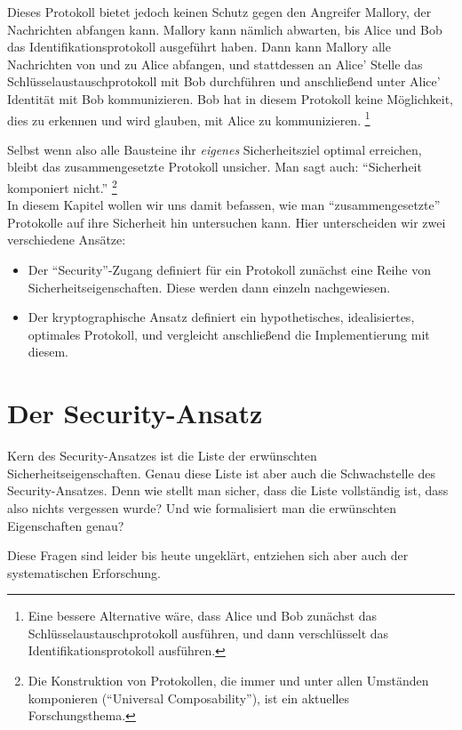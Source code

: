 \begin{beispiel}
	Dieses Protokoll bietet jedoch keinen Schutz gegen den Angreifer Mallory, der Nachrichten abfangen kann. Mallory kann nämlich abwarten, bis Alice und Bob das Identifikationsprotokoll ausgeführt haben. Dann kann Mallory alle Nachrichten von und zu Alice abfangen, und stattdessen an Alice' Stelle das Schlüsselaustauschprotokoll mit Bob durchführen und anschließend unter Alice' Identität mit Bob kommunizieren. Bob hat in diesem Protokoll keine Möglichkeit, dies zu erkennen und wird glauben, mit Alice zu kommunizieren.%
	\footnote{Eine bessere Alternative wäre, dass Alice und Bob zunächst das Schlüsselaustauschprotokoll ausführen, und dann verschlüsselt das Identifikationsprotokoll ausführen.}\\
\end{beispiel}

Selbst wenn also alle Bausteine ihr \emph{eigenes} Sicherheitsziel optimal erreichen, bleibt das zusammengesetzte Protokoll unsicher. Man sagt auch: "`Sicherheit komponiert nicht."'%
\footnote{Die Konstruktion von Protokollen, die immer und unter allen Umständen komponieren ("`Universal Composability"'), ist ein aktuelles Forschungsthema.}
\\

In diesem Kapitel wollen wir uns damit befassen, wie man "`zusammengesetzte"' Protokolle auf ihre Sicherheit hin untersuchen kann. Hier unterscheiden wir zwei verschiedene Ansätze:
\begin{itemize}
	\item Der "`Security"'-Zugang definiert für ein Protokoll zunächst eine Reihe von Sicherheitseigenschaften. Diese werden dann einzeln nachgewiesen.
	\item Der kryptographische Ansatz definiert ein hypothetisches, idealisiertes, optimales Protokoll, und vergleicht anschließend die Implementierung mit diesem.
\end{itemize}

\section{Der Security-Ansatz}

Kern des Security-Ansatzes ist die Liste der erwünschten Sicherheitseigenschaften. Genau diese Liste ist aber auch die Schwachstelle des Security-Ansatzes.
Denn wie stellt man sicher, dass die Liste vollständig ist, dass also nichts vergessen wurde?
Und wie formalisiert man die erwünschten Eigenschaften genau?

Diese Fragen sind leider bis heute ungeklärt, entziehen sich aber auch der systematischen Erforschung.

